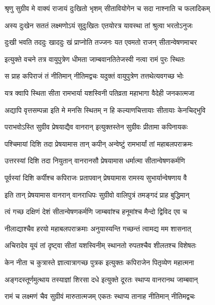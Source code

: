 \twolineshloka
{श्रृणु सुग्रीव मे वाक्यं राजायं दुःखितो भृशम्}
{सीतावियोगेन च सदा नाश्नाति च फलादिकम्} %

\twolineshloka
{अस्य दुःखेन सततं लक्ष्मणोऽयं सुदुःखितः}
{एतयोरत्र यावस्था तां श्रुत्वा भरतोऽनुजः} %

\twolineshloka
{दुःखी भवति तददुः खाददुः खं प्राप्नोति तज्जनः}
{यत एवमतो राजन् सीतान्वेषणमाचर} %

\twolineshloka
{इत्युक्ते वचने तत्र वायुपुत्रेण धीमता}
{जाम्बवानतितेजस्वी नत्वा रामं पुरः स्थितः} %

\twolineshloka
{स प्राह कपिराजं तं नीतिमान् नीतिमद्वचः}
{यदुक्तं वायुपुत्रेण तत्तथेत्यवगच्छ भोः} %

\twolineshloka
{यत्र क्वापि स्थिता सीता रामभार्या यशस्विनी}
{पतिव्रता महाभागा वैदेही जनकात्मजा} %

\twolineshloka
{अद्यापि वृत्तसम्पन्ना इति मे मनसि स्थितम्}
{न हि कल्याणचित्तायाः सीतायाः केनचिद्भुवि} %

\twolineshloka
{पराभवोऽस्ति सुग्रीव प्रेषयाद्यैव वानरान्}
{इत्युक्तस्तेन सुग्रीवः प्रीतामा कपिनायकः} %

\twolineshloka
{पश्चिमायां दिशि तदा प्रेषयामास तान् कपीन्}
{अन्वेष्टुं रामभार्यां तां महाबलपराक्रमः} %

\twolineshloka
{उत्तरस्यां दिशि तदा नियुतान् वानरानसौ}
{प्रेषयामास धर्मात्मा सीतान्वेषणकर्मणि} %

\twolineshloka
{पूर्वस्यां दिशि कर्पीश्च कपिराजः प्रतापवान्}
{प्रेषयामास रामस्य सुभार्यान्वेषणाय वै} %

\twolineshloka
{इति तान् प्रेषयामास वानरान् वानराधिपः}
{सुग्रीवो वालिपुत्रं तमङ्गदं प्राह बुद्धिमान्} %

\twolineshloka
{त्वं गच्छ दक्षिणं देशं सीतान्वेषणकर्मणि}
{जाम्बवांश्च हनूमांश्च मैन्दो द्विविद एव च} %

\twolineshloka
{नीलाद्याश्चैव हरयो महाबलपराक्रमाः}
{अनुयास्यन्ति गच्छन्तं त्वामद्य मम शासनात्} %

\twolineshloka
{अचिरादेव यूयं तां दृष्ट्वा सीतां यशस्विनीम्}
{स्थानतो रुपतश्चैव शीलतश्च विशेषतः} %

\twolineshloka
{केन नीता च कुत्रास्ते ज्ञात्वात्रागच्छ पुत्रक}
{इत्युक्तः कपिराजेन पितृव्येण महात्मना} %

\twolineshloka
{अङ्गदस्तूर्णमुत्थाय तस्याज्ञां शिरसा दधे}
{इत्युक्ते दूरतः स्थाप्य वानरानथ जाम्बवान्} %

\twolineshloka
{रामं च लक्ष्मणं चैव सुग्रीवं मारुतात्मजम्}
{एकतः स्थाप्य तानाह नीतिमान् नीतिमद्वचः} %

